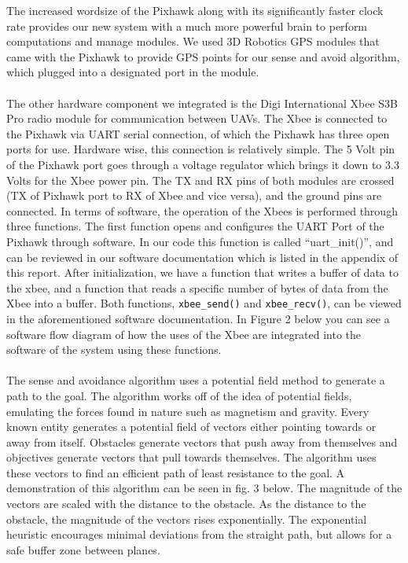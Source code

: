 \documentclass[12pt]{article}
\begin{document}
The increased wordsize of the Pixhawk along with its significantly faster clock rate provides our new system with a much more powerful brain to perform computations and manage modules. We used 3D Robotics GPS modules that came with the Pixhawk to provide GPS points for our sense and avoid algorithm, which plugged into a designated port in the module.\\\\
The other hardware component we integrated is the Digi International Xbee S3B Pro radio module for communication between UAVs. The Xbee is connected to the Pixhawk via UART serial connection, of which the Pixhawk has three open ports for use. Hardware wise, this connection is relatively simple. The 5 Volt pin of the Pixhawk port goes through a voltage regulator which brings it down to 3.3 Volts for the Xbee power pin. The TX and RX pins of both modules are crossed (TX of Pixhawk port to RX of Xbee and vice versa), and the ground pins are connected. In terms of software, the operation of the Xbees is performed through three functions. The first function opens and configures the UART Port of the Pixhawk through software. In our code this function is called “uart\_init()”, and can be reviewed in our software documentation which is listed in the appendix of this report. After initialization, we have a function that writes a buffer of data to the xbee, and a function that reads a specific number of bytes of data from the Xbee into a buffer. Both functions, \texttt{xbee\_send()} and \texttt{xbee\_recv()}, can be viewed in the aforementioned software documentation. In Figure 2 below you can see a software flow diagram of how the uses of the Xbee are integrated into the software of the system using these functions.\\\\
The sense and avoidance algorithm uses a potential field method to generate a path to the goal. The algorithm works off of the idea of potential fields, emulating the forces found in nature such as magnetism and gravity. Every known entity generates a potential field of vectors either pointing towards or away from itself. Obstacles generate vectors that push away from themselves and objectives generate vectors that pull towards themselves. The algorithm uses these vectors to find an efficient path of least resistance to the goal. A demonstration of this algorithm can be seen in fig. 3 below. The magnitude of the vectors are scaled with the distance to the obstacle. As the distance to the obstacle, the magnitude of the vectors rises exponentially. The exponential heuristic encourages minimal deviations from the straight path, but allows for a safe buffer zone between planes.
\end{document}
